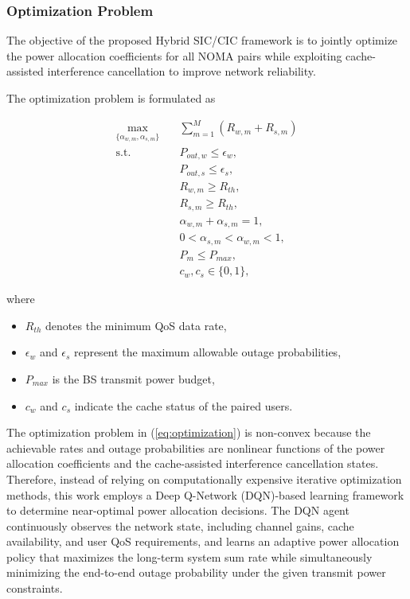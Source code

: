 \documentclass[12pt,a4paper]{article}
\begin{document}
\subsubsection{Optimization Problem}

The objective of the proposed Hybrid SIC/CIC framework is to jointly optimize the power allocation coefficients for all NOMA pairs while exploiting cache-assisted interference cancellation to improve network reliability.

The optimization problem is formulated as

\begin{equation}
\begin{aligned}
\max_{\{\alpha_{w,m},\alpha_{s,m}\}}
\quad
&
\sum_{m=1}^{M}
\left(
R_{w,m}+R_{s,m}
\right)
\\
\text{s.t.}
\quad
&
P_{out,w}\le\epsilon_w,
\\
&
P_{out,s}\le\epsilon_s,
\\
&
R_{w,m}\ge R_{th},
\\
&
R_{s,m}\ge R_{th},
\\
&
\alpha_{w,m}+\alpha_{s,m}=1,
\\
&
0<\alpha_{s,m}<\alpha_{w,m}<1,
\\
&
P_m\le P_{max},
\\
&
c_w,c_s\in\{0,1\},
\end{aligned}
\label{eq:optimization}
\end{equation}

where

\begin{itemize}

\item $R_{th}$ denotes the minimum QoS data rate,

\item $\epsilon_w$ and $\epsilon_s$ represent the maximum allowable outage probabilities,

\item $P_{max}$ is the BS transmit power budget,

\item $c_w$ and $c_s$ indicate the cache status of the paired users.

\end{itemize}

The optimization problem in (\ref{eq:optimization}) is non-convex because the achievable rates and outage probabilities are nonlinear functions of the power allocation coefficients and the cache-assisted interference cancellation states. Therefore, instead of relying on computationally expensive iterative optimization methods, this work employs a Deep Q-Network (DQN)-based learning framework to determine near-optimal power allocation decisions. The DQN agent continuously observes the network state, including channel gains, cache availability, and user QoS requirements, and learns an adaptive power allocation policy that maximizes the long-term system sum rate while simultaneously minimizing the end-to-end outage probability under the given transmit power constraints.
\end{document}
